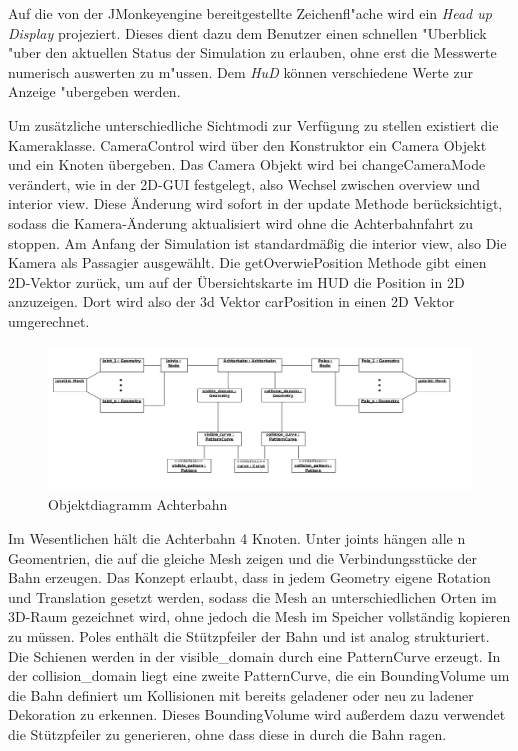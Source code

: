 Auf die von der JMonkeyengine bereitgestellte Zeichenfl"ache wird ein \textsl{Head up Display} projeziert. Dieses dient dazu dem Benutzer einen schnellen 
"Uberblick "uber den  aktuellen Status der Simulation zu erlauben, ohne erst die Messwerte numerisch auswerten zu m"ussen. Dem \textsl{HuD} können verschiedene Werte zur
Anzeige "ubergeben werden.

Um zusätzliche unterschiedliche Sichtmodi zur Verfügung zu stellen existiert die Kameraklasse. CameraControl wird über den Konstruktor ein Camera Objekt und ein Knoten übergeben. Das Camera Objekt wird bei changeCameraMode verändert, wie in der 2D-GUI festgelegt, also Wechsel zwischen overview und interior view. Diese Änderung wird sofort in der update Methode berücksichtigt, sodass die Kamera-Änderung aktualisiert wird ohne die Achterbahnfahrt zu stoppen. Am Anfang der Simulation ist standardmäßig die interior view, also Die Kamera als Passagier ausgewählt. Die getOverwiePosition Methode gibt einen 2D-Vektor zurück, um auf der Übersichtskarte im HUD die Position in 2D anzuzeigen. Dort wird also der 3d Vektor carPosition in einen 2D Vektor umgerechnet.

\begin{figure}
\includegraphics[width=\linewidth]{bilder/objektdiagramm_004}
\caption{Objektdiagramm Achterbahn}
\end{figure}

Im Wesentlichen hält die Achterbahn 4 Knoten. Unter joints hängen alle n Geomentrien, die auf die gleiche Mesh zeigen und die Verbindungsstücke der Bahn erzeugen. Das Konzept erlaubt, dass in jedem Geometry eigene Rotation und Translation gesetzt werden, sodass die Mesh an unterschiedlichen Orten im 3D-Raum gezeichnet wird, ohne jedoch die Mesh im Speicher vollständig kopieren zu müssen. Poles enthält die Stützpfeiler der Bahn und ist analog strukturiert.
Die Schienen werden in der visible\_domain durch eine PatternCurve erzeugt. In der collision\_domain liegt eine zweite PatternCurve, die ein BoundingVolume um die Bahn definiert um Kollisionen mit bereits geladener oder neu zu ladener Dekoration zu erkennen. Dieses BoundingVolume wird außerdem dazu verwendet die Stützpfeiler zu generieren, ohne dass diese in durch die Bahn ragen.

